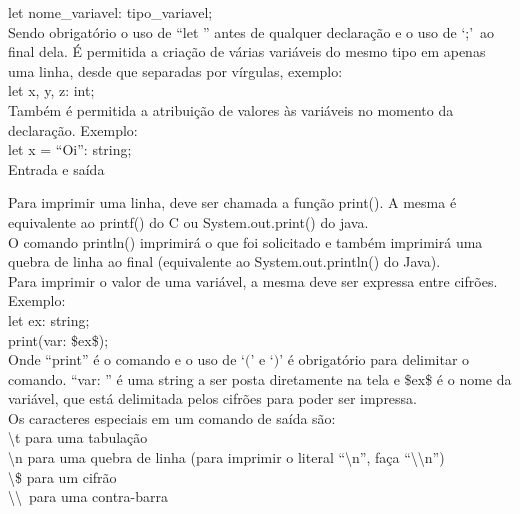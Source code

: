 \documentclass[12pt,a4paper]{article}
\begin{document}
let nome\_variavel: tipo\_variavel;\\

Sendo obrigatório o uso de ``let '' antes de qualquer declaração e o uso de `;'\ ao final dela. É permitida a criação de várias variáveis do mesmo tipo em apenas uma linha, desde que separadas por vírgulas, exemplo:\\

let x, y, z: int;\\

Também é permitida a atribuição de valores às variáveis no momento da declaração. Exemplo:\\

let x = ``Oi'': string;\\

\hypertarget{label1}{\Large{Entrada e saída}}\\[0.3cm]
\normalsize

Para imprimir uma linha, deve ser chamada a função print(). A mesma é equivalente ao printf() do C ou System.out.print() do java.\\
O comando println() imprimirá o que foi solicitado e também imprimirá uma quebra de linha ao final (equivalente ao System.out.println() do Java).\\

Para imprimir o valor de uma variável, a mesma deve ser expressa entre cifrões. Exemplo: \\

let ex: string;\\

print(var: \$ex\$); \\

Onde ``print'' é o comando e o uso de `$($' e `$)$' é obrigatório para delimitar o comando. ``var: '' é uma string a ser posta diretamente na tela e \$ex\$ é o nome da variável, que está delimitada pelos cifrões para poder ser impressa.\\

Os caracteres especiais em um comando de saída são:\\[0.2cm]
\textbackslash t para uma tabulação \\
\textbackslash n para uma quebra de linha (para imprimir o literal ``\textbackslash n'', faça ``\textbackslash \textbackslash n'')\\
\textbackslash \$ para um cifrão \\
\textbackslash \textbackslash\ para uma contra-barra \\
\end{document}
